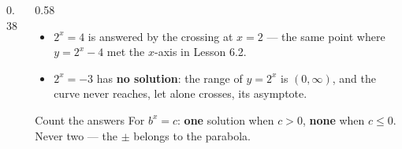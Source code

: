 \documentclass[aspectratio=169, 11pt]{beamer}
\newcommand{\lgrid}[4]{%
  \draw[step=1, linegray!45, thin] (#1,#3) grid (#2,#4);
  \draw[->, thick, charcoal] (#1,0)--(#2,0) node[below right, font=\tiny]{$x$};
  \draw[->, thick, charcoal] (0,#3)--(0,#4) node[left, font=\tiny]{$y$};}
\newcommand{\expgraph}[6]{\draw[very thick, forest, domain=#5:#6, samples=140, smooth]
  plot (\x,{(#1)*exp((#2)*((\x)-(#3)))+(#4)});}
\newcommand{\solline}[3]{\draw[goldacc, very thick] (#1,#3)--(#2,#3);}
\begin{document}
\begin{frame}[t, plain]
  \begin{columns}[T]
    \begin{column}{0.38\textwidth}
      \centering
    \end{column}
    \begin{column}{0.58\textwidth}
      \footnotesize
      \begin{itemize}\setlength{\itemsep}{4pt}
        \item $2^{x}=4$ \; is answered by the crossing at $x=2$ --- the same point where $y=2^{x}-4$
              met the $x$-axis in Lesson 6.2.
        \item $2^{x}=-3$ \; has \textbf{no solution}: the range of $y=2^{x}$ is $(0,\infty)$, and the
              curve never reaches, let alone crosses, its asymptote.
      \end{itemize}
      \vspace{3pt}
      \begin{block}{Count the answers}
        For $b^{x}=c$: \textbf{one} solution when $c>0$, \textbf{none} when $c\le0$. Never two --- the
        $\pm$ belongs to the parabola.
      \end{block}
    \end{column}
  \end{columns}
\end{frame}
\end{document}
